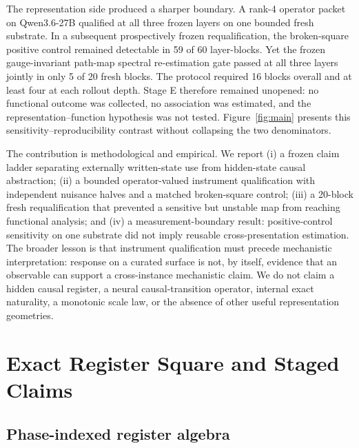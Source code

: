 \documentclass[10pt,a4paper]{article}
\begin{document}
The representation side produced a sharper boundary. A rank-4 operator packet on Qwen3.6-27B qualified at all three frozen layers on one bounded fresh substrate. In a subsequent prospectively frozen requalification, the broken-square positive control remained detectable in 59 of 60 layer-blocks. Yet the frozen gauge-invariant path-map spectral re-estimation gate passed at all three layers jointly in only 5 of 20 fresh blocks. The protocol required 16 blocks overall and at least four at each rollout depth. Stage E therefore remained unopened: no functional outcome was collected, no association was estimated, and the representation--function hypothesis was not tested. Figure~\ref{fig:main} presents this sensitivity--reproducibility contrast without collapsing the two denominators.

The contribution is methodological and empirical. We report (i) a frozen claim ladder separating externally written-state use from hidden-state causal abstraction; (ii) a bounded operator-valued instrument qualification with independent nuisance halves and a matched broken-square control; (iii) a 20-block fresh requalification that prevented a sensitive but unstable map from reaching functional analysis; and (iv) a measurement-boundary result: positive-control sensitivity on one substrate did not imply reusable cross-presentation estimation. The broader lesson is that instrument qualification must precede mechanistic interpretation: response on a curated surface is not, by itself, evidence that an observable can support a cross-instance mechanistic claim. We do not claim a hidden causal register, a neural causal-transition operator, internal exact naturality, a monotonic scale law, or the absence of other useful representation geometries.



\section{Exact Register Square and Staged Claims}
\label{sec:square}

\subsection{Phase-indexed register algebra}
\end{document}
